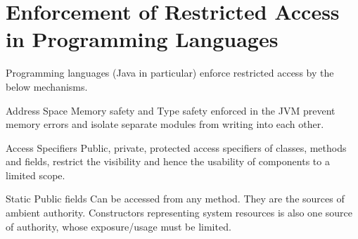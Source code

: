 \documentclass[11pt]{article} %
\begin{document}
\section {Enforcement of Restricted Access in Programming Languages}
Programming languages (Java in particular) enforce restricted access by the below
mechanisms.
\begin {description} \itemsep -2pt
\item [Address Space] Memory safety and Type safety enforced in the JVM prevent
memory errors and isolate separate modules from writing into each other.
\item [Access Specifiers] Public, private, protected access specifiers of classes,
methods and fields, restrict the visibility and hence the usability of components
to a limited scope.
\item [Static Public fields] Can be accessed from any method. They are the sources
of ambient authority. Constructors representing system resources is also one
source of authority, whose exposure/usage must be limited.
\end {description}
\end{document}
